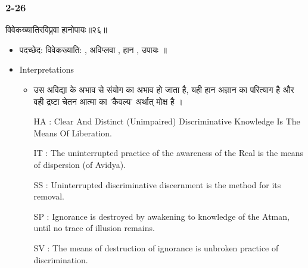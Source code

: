 \begin{frame}[fragile]\frametitle{2-26}
\begin{sanskrit}
विवेकख्यातिरविप्लवा हानोपायः॥२६॥
\end{sanskrit}

	\begin{itemize}
	\item पदच्छेद: विवेकख्याति: , अविप्लवा , हान , उपायः ॥
	\item Interpretations
		\begin{itemize}
		\item उस अविद्या के अभाव से संयोग का अभाव हो जाता है, यही हान अज्ञान का परित्याग है और वही द्रष्टा चेतन आत्मा का 'कैवल्य' अर्थात् मोक्ष है ।
		\item [HA]: Clear And Distinct (Unimpaired) Discriminative Knowledge Is The Means Of Liberation.
		\item [IT]: The uninterrupted practice of the awareness of the Real is the means of dispersion (of Avidya).
		\item [SS]: Uninterrupted discriminative discernment is the method for its removal.
		\item [SP]: Ignorance is destroyed by awakening to knowledge of the Atman, until no trace of illusion remains.
		\item [SV]: The means of destruction of ignorance is unbroken practice of discrimination. 
		\end{itemize}
	\end{itemize}
	
\end{frame}

